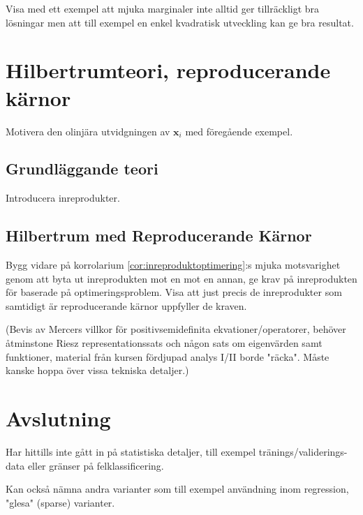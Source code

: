 \documentclass[a4paper, 12pt]{report}
\theoremstyle{definition}
\theoremstyle{remark}
\begin{document}
\newpage
Visa med ett exempel att mjuka marginaler inte alltid ger tillräckligt bra lösningar men att till exempel en enkel kvadratisk utveckling kan ge bra resultat.

\chapter{Hilbertrumteori, reproducerande kärnor}\label{chap:hilbert}
Motivera den olinjära utvidgningen av $\mathbf{x}_i$ med föregående exempel.
\section{Grundläggande teori}
Introducera inreprodukter.
\section{Hilbertrum med Reproducerande Kärnor}
Bygg vidare på korrolarium \ref{cor:inreproduktoptimering}:s mjuka motsvarighet genom att byta ut inreprodukten mot en mot en annan, ge krav på inreprodukten för baserade på optimeringsproblem. Visa att just precis de inreprodukter som samtidigt är reproducerande kärnor uppfyller de kraven.

(Bevis av Mercers villkor för positivsemidefinita ekvationer/operatorer, behöver åtminstone Riesz representationssats och någon sats om eigenvärden samt funktioner, material från kursen fördjupad analys I/II borde "räcka". Måste kanske hoppa över vissa tekniska detaljer.)

\chapter{Avslutning}
Har hittills inte gått in på statistiska detaljer, till exempel tränings/validerings-data eller gränser på felklassificering.

Kan också nämna andra varianter som till exempel användning inom regression, "glesa" (sparse) varianter.



\end{document}
